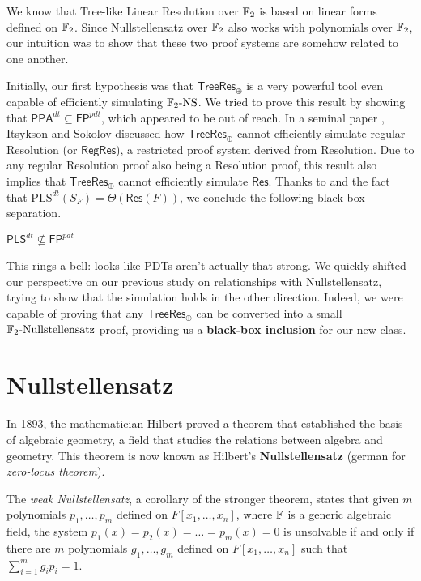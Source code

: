 We know that Tree-like Linear Resolution over $\mathbb{F}_2$ is based on linear forms defined on $\mathbb{F}_2$. Since Nullstellensatz over $\mathbb{F}_2$ also works with polynomials over $\mathbb{F}_2$, our intuition was to show that these two proof systems are somehow related to one another.

Initially, our first hypothesis was that $\mathsf{TreeRes}_\oplus$ is a very powerful tool even capable of efficiently simulating $\mathrm{\mathbb{F}_2\text{-}NS}$. We tried to prove this result by showing that $\mathsf{PPA}^{dt} \subseteq \mathsf{FP}^{pdt}$, which appeared to be out of reach. In a seminal paper \cite{res_lin_2}, Itsykson and Sokolov discussed how $\mathsf{TreeRes}_\oplus$ cannot efficiently simulate regular Resolution (or $\mathsf{RegRes}$), a restricted proof system derived from Resolution. Due to any regular Resolution proof also being a Resolution proof, this result also implies that $\mathsf{TreeRes}_\oplus$ cannot efficiently simulate $\mathsf{Res}$. Thanks to  and the fact that $\mathrm{PLS}^{dt}(S_F) = \Theta(\mathsf{Res}(F))$, we conclude the following black-box separation.

\begin{corollary}
    \label{pls_not_inside_fp_pdt}
    $\mathsf{PLS}^{dt} \not\subseteq \mathsf{FP}^{pdt}$
\end{corollary}

This rings a bell: looks like PDTs aren't actually that strong. We quickly shifted our perspective on our previous study on relationships with Nullstellensatz, trying to show that the simulation holds in the other direction. Indeed, we were capable of proving that any $\mathsf{TreeRes}_\oplus$ can be converted into a small $\mathrm{\mathbb{F}_2\text{-}Nullstellensatz}$ proof, providing us a \textbf{black-box inclusion} for our new class.

\section{Nullstellensatz}

In 1893, the mathematician Hilbert proved a theorem that established the basis of algebraic geometry, a field that studies the relations between algebra and geometry. This theorem is now known as Hilbert's \textbf{Nullstellensatz} (german for \textit{zero-locus theorem}).

The \textit{weak Nullstellensatz}, a corollary of the stronger theorem, states that given $m$ polynomials $p_1, \ldots, p_m$ defined on $F[x_1, \ldots, x_n]$, where $\mathbb{F}$ is a generic algebraic field, the system $p_1(x) = p_2(x) = \ldots = p_m(x) = 0$ is unsolvable if and only if there are $m$ polynomials $g_1, \ldots, g_m$ defined on $F[x_1, \ldots, x_n]$ such that $\sum_{i=1}^m g_ip_i = 1$.


